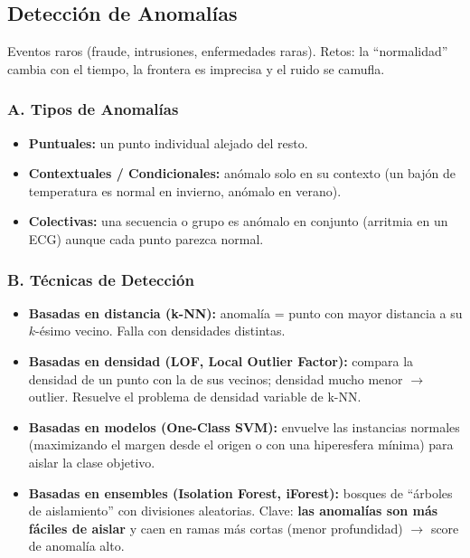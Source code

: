 \documentclass[12pt]{book} %
\providecommand{\tightlist}{%
  \setlength{\itemsep}{0pt}\setlength{\parskip}{0pt}}
\begin{document}
\hypertarget{detecciuxf3n-de-anomaluxedas}{%
\subsection{Detección de Anomalías}\label{detecciuxf3n-de-anomaluxedas}}

Eventos raros (fraude, intrusiones, enfermedades raras). Retos: la
``normalidad'' cambia con el tiempo, la frontera es imprecisa y el ruido
se camufla.

\hypertarget{a.-tipos-de-anomaluxedas}{%
\subsubsection{A. Tipos de Anomalías}\label{a.-tipos-de-anomaluxedas}}

\begin{itemize}
\tightlist
\item
  \textbf{Puntuales:} un punto individual alejado del resto.
\item
  \textbf{Contextuales / Condicionales:} anómalo solo en su contexto (un
  bajón de temperatura es normal en invierno, anómalo en verano).
\item
  \textbf{Colectivas:} una secuencia o grupo es anómalo en conjunto
  (arritmia en un ECG) aunque cada punto parezca normal.
\end{itemize}

\hypertarget{b.-tuxe9cnicas-de-detecciuxf3n}{%
\subsubsection{B. Técnicas de
Detección}\label{b.-tuxe9cnicas-de-detecciuxf3n}}

\begin{itemize}
\tightlist
\item
  \textbf{Basadas en distancia (k-NN):} anomalía = punto con mayor
  distancia a su \(k\)-ésimo vecino. Falla con densidades distintas.
\item
  \textbf{Basadas en densidad (LOF, Local Outlier Factor):} compara la
  densidad de un punto con la de sus vecinos; densidad mucho menor
  \(\to\) outlier. Resuelve el problema de densidad variable de k-NN.
\item
  \textbf{Basadas en modelos (One-Class SVM):} envuelve las instancias
  normales (maximizando el margen desde el origen o con una hiperesfera
  mínima) para aislar la clase objetivo.
\item
  \textbf{Basadas en ensembles (Isolation Forest, iForest):} bosques de
  ``árboles de aislamiento'' con divisiones aleatorias. Clave:
  \textbf{las anomalías son más fáciles de aislar} y caen en ramas más
  cortas (menor profundidad) \(\to\) score de anomalía alto.
\end{itemize}
\end{document}
